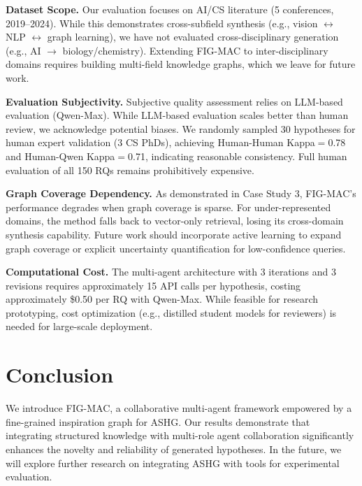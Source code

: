 \documentclass[runningheads]{llncs}
\begin{document}
\textbf{Dataset Scope.} Our evaluation focuses on AI/CS literature (5 conferences, 2019--2024). While this demonstrates cross-subfield synthesis (e.g., vision $\leftrightarrow$ NLP $\leftrightarrow$ graph learning), we have not evaluated cross-disciplinary generation (e.g., AI $\rightarrow$ biology/chemistry). Extending FIG-MAC to inter-disciplinary domains requires building multi-field knowledge graphs, which we leave for future work.

\textbf{Evaluation Subjectivity.} Subjective quality assessment relies on LLM-based evaluation (Qwen-Max). While LLM-based evaluation scales better than human review, we acknowledge potential biases. We randomly sampled 30 hypotheses for human expert validation (3 CS PhDs), achieving Human-Human Kappa$=$0.78 and Human-Qwen Kappa$=$0.71, indicating reasonable consistency. Full human evaluation of all 150 RQs remains prohibitively expensive.

\textbf{Graph Coverage Dependency.} As demonstrated in Case Study 3, FIG-MAC's performance degrades when graph coverage is sparse. For under-represented domains, the method falls back to vector-only retrieval, losing its cross-domain synthesis capability. Future work should incorporate active learning to expand graph coverage or explicit uncertainty quantification for low-confidence queries.

\textbf{Computational Cost.} The multi-agent architecture with 3 iterations and 3 revisions requires approximately 15 API calls per hypothesis, costing approximately \$0.50 per RQ with Qwen-Max. While feasible for research prototyping, cost optimization (e.g., distilled student models for reviewers) is needed for large-scale deployment.


\section{Conclusion}
\label{sec:conclusion}

We introduce FIG-MAC, a collaborative multi-agent framework empowered by a fine-grained inspiration graph for ASHG. Our results demonstrate that integrating structured knowledge with multi-role agent collaboration significantly enhances the novelty and reliability of generated hypotheses. In the future, we will explore further research on integrating ASHG with tools for experimental evaluation.


\end{document}
